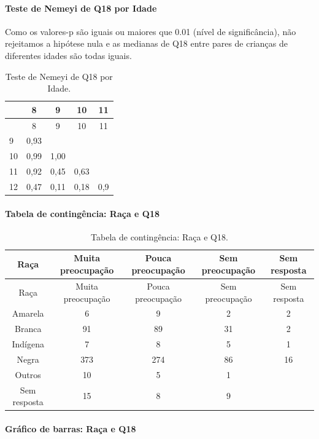 \documentclass[]{article}
\let\oldparagraph\paragraph
\renewcommand{\paragraph}[1]{\oldparagraph{#1}\mbox{}}
\begin{document}
\hypertarget{teste-de-nemeyi-de-q18-por-idade}{%
\paragraph{Teste de Nemeyi de Q18 por Idade}\label{teste-de-nemeyi-de-q18-por-idade}}

Como os valores-p são iguais ou maiores que 0.01 (nível de significância), não rejeitamos a hipótese nula e as medianas de Q18 entre pares de crianças de diferentes idades são todas iguais.

\begin{longtable}[]{@{}lcccc@{}}
\caption{\label{tab:unnamed-chunk-278}Teste de Nemeyi de Q18 por Idade.}\tabularnewline
\toprule
& 8 & 9 & 10 & 11\tabularnewline
\midrule
\endfirsthead
\toprule
& 8 & 9 & 10 & 11\tabularnewline
\midrule
\endhead
9 & 0,93 & & &\tabularnewline
10 & 0,99 & 1,00 & &\tabularnewline
11 & 0,92 & 0,45 & 0,63 &\tabularnewline
12 & 0,47 & 0,11 & 0,18 & 0,9\tabularnewline
\bottomrule
\end{longtable}

\cleardoublepage

\hypertarget{tabela-de-continguxeancia-rauxe7a-e-q18}{%
\paragraph{Tabela de contingência: Raça e Q18}\label{tabela-de-continguxeancia-rauxe7a-e-q18}}

\begin{longtable}[]{@{}ccccc@{}}
\caption{\label{tab:unnamed-chunk-279}Tabela de contingência: Raça e Q18.}\tabularnewline
\toprule
Raça & Muita preocupação & Pouca preocupação & Sem preocupação & Sem resposta\tabularnewline
\midrule
\endfirsthead
\toprule
Raça & Muita preocupação & Pouca preocupação & Sem preocupação & Sem resposta\tabularnewline
\midrule
\endhead
Amarela & 6 & 9 & 2 & 2\tabularnewline
Branca & 91 & 89 & 31 & 2\tabularnewline
Indígena & 7 & 8 & 5 & 1\tabularnewline
Negra & 373 & 274 & 86 & 16\tabularnewline
Outros & 10 & 5 & 1 &\tabularnewline
Sem resposta & 15 & 8 & 9 &\tabularnewline
\bottomrule
\end{longtable}

\hypertarget{gruxe1fico-de-barras-rauxe7a-e-q18}{%
\paragraph{Gráfico de barras: Raça e Q18}\label{gruxe1fico-de-barras-rauxe7a-e-q18}}
\end{document}

